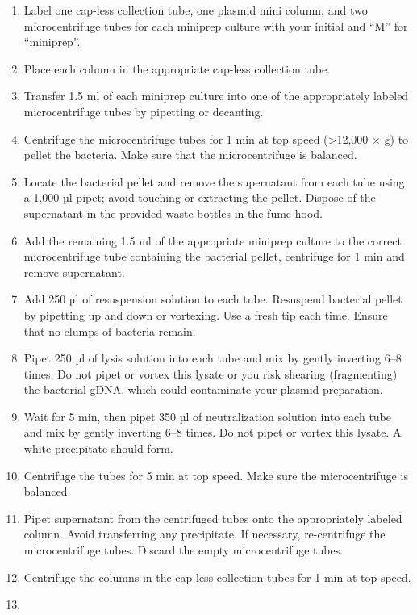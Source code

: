 \documentclass[]{book}
\providecommand{\tightlist}{%
  \setlength{\itemsep}{0pt}\setlength{\parskip}{0pt}}
\begin{document}
\begin{enumerate}
\def\labelenumi{\arabic{enumi}.}
\tightlist
\item
  Label one cap-less collection tube, one plasmid mini column, and two microcentrifuge tubes for each miniprep culture with your initial and ``M'' for ``miniprep''.
\item
  Place each column in the appropriate cap-less collection tube.
\item
  Transfer 1.5 ml of each miniprep culture into one of the appropriately labeled microcentrifuge tubes by pipetting or decanting.
\item
  Centrifuge the microcentrifuge tubes for 1 min at top speed (\textgreater{}12,000 × g) to pellet the bacteria. Make sure that the microcentrifuge is balanced.
\item
  Locate the bacterial pellet and remove the supernatant from each tube using a 1,000 µl pipet; avoid touching or extracting the pellet. Dispose of the supernatant in the provided waste bottles in the fume hood.
\item
  Add the remaining 1.5 ml of the appropriate miniprep culture to the correct microcentrifuge tube containing the bacterial pellet, centrifuge for 1 min and remove supernatant.
\item
  Add 250 µl of resuspension solution to each tube. Resuspend bacterial pellet by pipetting up and down or vortexing. Use a fresh tip each time. Ensure that no clumps of bacteria remain.
\item
  Pipet 250 µl of lysis solution into each tube and mix by gently inverting 6--8 times. Do not pipet or vortex this lysate or you risk shearing (fragmenting) the bacterial gDNA, which could contaminate your plasmid preparation.
\item
  Wait for 5 min, then pipet 350 µl of neutralization solution into each tube and mix by gently inverting 6--8 times. Do not pipet or vortex this lysate. A white precipitate should form.
\item
  Centrifuge the tubes for 5 min at top speed. Make sure the microcentrifuge is balanced.
\item
  Pipet supernatant from the centrifuged tubes onto the appropriately labeled column. Avoid
  transferring any precipitate. If necessary, re-centrifuge the microcentrifuge tubes. Discard the empty microcentrifuge tubes.
\item
  Centrifuge the columns in the cap-less collection tubes for 1 min at top speed.
\item

\end{enumerate}
\end{document}

